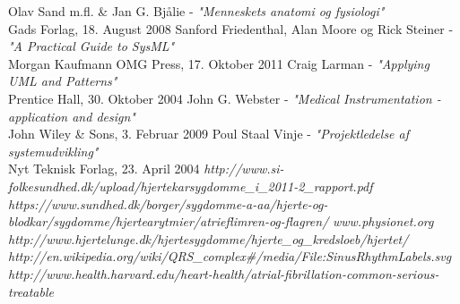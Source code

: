 \begin{thebibliography}{9}
 Olav Sand m.fl. \& Jan G. Bjålie - \textit{"Menneskets anatomi og fysiologi"}\\ Gads Forlag, 18. August 2008
 Sanford Friedenthal, Alan Moore og Rick Steiner - \textit{"A Practical Guide to SysML"} \\Morgan Kaufmann OMG Press, 17. Oktober 2011
 Craig Larman -
	\textit{"Applying UML and Patterns"}\\ Prentice Hall, 30. Oktober 2004
 John G. Webster - \textit{"Medical Instrumentation - application and design"}\\ John Wiley \& Sons, 3. Februar 2009
 Poul Staal Vinje - \textit{"Projektledelse af systemudvikling"}\\ Nyt Teknisk Forlag, 23. April 2004
 \textit{http://www.si-folkesundhed.dk/upload/hjertekarsygdomme\_i\_2011-2\_rapport.pdf}
 \textit{https://www.sundhed.dk/borger/sygdomme-a-aa/hjerte-og-blodkar/sygdomme/hjertearytmier/atrieflimren-og-flagren/}
 \textit{www.physionet.org}
\textit{http://www.hjertelunge.dk/hjertesygdomme/hjerte\_og\_kredsloeb/hjertet/}
 \textit{http://en.wikipedia.org/wiki/QRS\_complex\#/media/File:SinusRhythmLabels.svg}
 \textit{http://www.health.harvard.edu/heart-health/atrial-fibrillation-common-serious-treatable}


\end{thebibliography}




